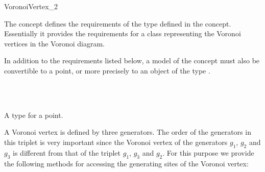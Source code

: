 


\begin{ccRefConcept}{VoronoiVertex_2}

\ccDefinition

The concept  defines the requirements of the
 type defined in the 
concept. Essentially it provides the requirements for a class
representing the Voronoi vertices in the Voronoi diagram.

In addition to the requirements listed below, a model of the
 concept must also be convertible to a
point, or more precisely to an object of the type
.


\ccRefines
{}\\
\\

\ccTypes
{}
%
\ccGlue
{}
{}
{A type for a point.}




A Voronoi vertex is defined by three generators. The order of the
generators in this triplet is very important since the Voronoi vertex
of the generators $g_1$, $g_2$ and $g_3$ is different from that of the
triplet $g_1$, $g_3$ and $g_2$. For this purpose we provide the
following methods for accessing the generating sites of the Voronoi
vertex:


\end{ccRefConcept}
